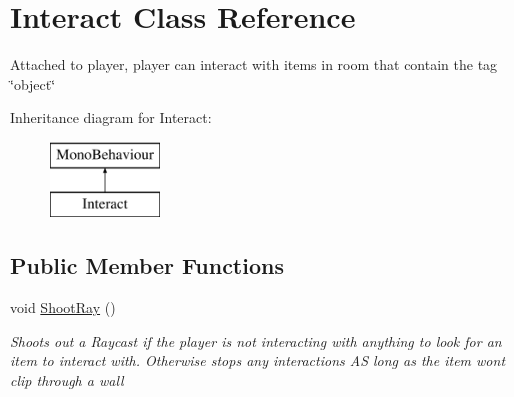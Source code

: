 \hypertarget{class_interact}{}\section{Interact Class Reference}
\label{class_interact}


Attached to player, player can interact with items in room that contain the tag \char`\"{}object\char`\"{}  


Inheritance diagram for Interact\+:\begin{figure}[H]
\begin{center}
\leavevmode
\includegraphics[height=2.000000cm]{class_interact}
\end{center}
\end{figure}
\subsection*{Public Member Functions}
\begin{DoxyCompactItemize}
\item 
void \hyperlink{class_interact_a00d52190f6c42bb20a5a81cead623c0f}{Shoot\+Ray} ()
\begin{DoxyCompactList}\small\item\em Shoots out a Raycast if the player is not interacting with anything to look for an item to interact with. Otherwise stops any interactions AS long as the item won\textquotesingle{}t clip through a wall \end{DoxyCompactList}\end{DoxyCompactItemize}

